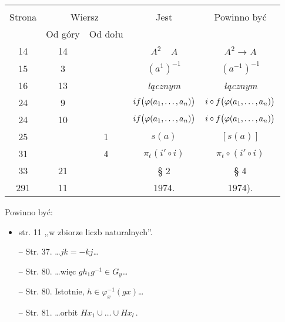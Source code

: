 \documentclass[a4paper,11pt]{article}
\begin{document}
\begin{center}
  \begin{tabular}{|c|c|c|c|c|}
    \hline
    & \multicolumn{2}{c|}{} & & \\
    Strona & \multicolumn{2}{c|}{Wiersz} & Jest
                              & Powinno być \\ \cline{2-3}
    & Od góry & Od dołu & & \\
    \hline
    14 & 14 & & $A^{ 2 } \quad A$ & $A^{ 2 } \to A$ \\
    15 & 3 & & $( a^{ 1 } )^{ -1 }$ & $( a^{ -1 } )^{ -1 }$ \\
    16 & 13 & & \emph{lącznym} & \emph{łącznym} \\
    24 & 9 & & $if\big( \varphi( a_{ 1 }, \ldots, a_{ n } ) \big)$
           & $i \circ f\big( \varphi( a_{ 1 }, \ldots, a_{ n } ) \big)$ \\
    24 & 10 & & $if\big( \varphi( a_{ 1 }, \ldots, a_{ n } ) \big)$
           & $i \circ f\big( \varphi( a_{ 1 }, \ldots, a_{ n } ) \big)$ \\
    25 & & 1 & $s( a )$ & $[ s( a ) ]$ \\
    31 & & 4 & $\pi_{ t }( i' \circ i )$
           & $\pi_{ t } \circ ( i' \circ i )$ \\
    33 & 21 & & \S{} 2 & \S{} 4 \\
    291 & 11 & & 1974. & 1974). \\
    \hline
  \end{tabular}
\end{center}

Powinno być:
\begin{itemize}
  \item str. 11 ,,w zbiorze liczb naturalnych''.
\item[--] Str. 37. \ldots$j k = -k j$\ldots
\item[--] Str. 80. \ldots więc $g h_{ 1 } g^{ -1 } \in G_{ y }$\ldots
\item[--] Str. 80. Istotnie, $h \in \varphi_{ x }^{ -1 }( g x )$\ldots
\item[--] Str. 81. \ldots orbit
  $H x_{ 1 } \cup \ldots \cup H x_{ l } \, .$
\end{itemize}
\end{document}
